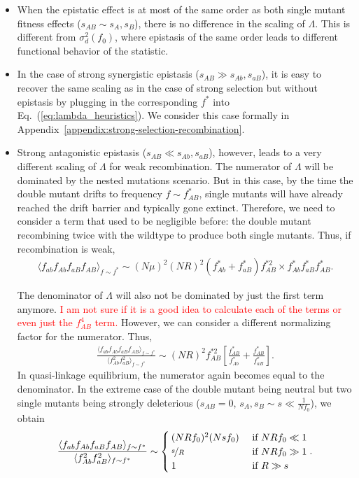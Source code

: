 \documentclass[aps,rmp,twocolumn,groupedaddress,floatfix,notitlepage]{revtex4-1}
\begin{document}
\begin{itemize}
\item When the epistatic effect is at most of the same order as both single mutant fitness effects ($s_{AB} \sim s_A, s_B$), there is no difference in the scaling of $\Lambda$. This is different from $\sigma^2_d(f_0)$, where epistasis of the same order leads to different functional behavior of the statistic.

\item In the case of strong synergistic epistasis ($s_{AB} \gg s_{Ab}, s_{aB}$), it is easy to recover the same scaling as in the case of strong selection but without epistasis by plugging in the corresponding $f^*$ into Eq.~(\ref{eq:lambda_heuristics}). We consider this case formally in Appendix~\ref{appendix:strong-selection-recombination}.

\item Strong antagonistic epistasis ($s_{AB} \ll s_{Ab}, s_{aB}$), however, leads to a very different scaling of $\Lambda$ for weak recombination. The numerator of $\Lambda$ will be dominated by the nested mutations scenario. But in this case, by the time the double mutant drifts to frequency $f \sim f^*_{AB}$, single mutants will have already reached the drift barrier and typically gone extinct. Therefore, we need to consider a term that used to be negligible before: the double mutant recombining twice with the wildtype to produce both single mutants. Thus, if recombination is weak, 
\begin{align}
    \langle f_{ab} f_{Ab} f_{aB} f_{AB}\rangle_{f \sim f^*} \sim 
    (N\mu)^2 (NR)^2 (f^*_{Ab} + f^*_{aB})f^{*2}_{AB} \times f^*_{Ab} f^*_{aB} f^*_{AB}.
\end{align}


The denominator of $\Lambda$ will also not be dominated by just the first term anymore. \textcolor{red}{I am not sure if it is a good idea to calculate each of the terms or even just the $f^4_{AB}$ term.} However, we can consider a different normalizing factor for the numerator. Thus, 
\begin{align}
    \frac{\langle f_{ab} f_{Ab} f_{aB} f_{AB}\rangle_{f \sim f^*}}{\langle f_{Ab}^2 f_{aB}^2\rangle_{f \sim f^*}} \sim (NR)^2 f^{*2}_{AB} \left[ \frac{f^*_{AB}}{f^*_{Ab}} + \frac{f^*_{AB}}{f^*_{aB}}\right].
\end{align}
In quasi-linkage equilibrium, the numerator again becomes equal to the denominator. 
In the extreme case of the double mutant being neutral but two single mutants being strongly deleterious ($s_{AB} = 0$, $s_A, s_B \sim s \ll \frac{1}{Nf_0}$),
we obtain 
\begin{align}
    \frac{\langle f_{ab} f_{Ab} f_{aB} f_{AB}\rangle_{f \sim f^*}}{\langle f_{Ab}^2 f_{aB}^2\rangle_{f \sim f^*}} \sim 
    \begin{cases}
    (NRf_0)^2(Nsf_0) &\text{ if $NRf_0 \ll 1$} \\
    \nicefrac{s}{R} &\text{ if $NRf_0 \gg 1$} \\
    1 &\text{ if $R \gg s$}
    \end{cases}.
\end{align}


\end{itemize}
\end{document}
